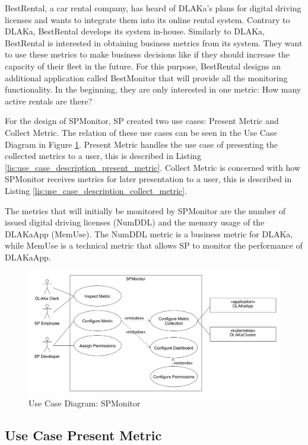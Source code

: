 BestRental, a car rental company, has heard of DLAKa's plans for digital driving licenses
and wants to integrate them into its online rental system. Contrary to DLAKa, BestRental develops its
system in-house. Similarly to DLAKa, BestRental is interested in obtaining business metrics from its system.
They want to use these metrics to make business decisions like if they should increase the capacity of their fleet in the future.
For this purpose, BestRental designs an additional application called BestMonitor that will provide all the monitoring functionality.
In the beginning, they are only interested in one metric: How many active rentals are there?

For the design of SPMonitor, SP created two use cases: Present Metric and Collect Metric.
The relation of these use cases can be seen in the Use Case Diagram in Figure \ref{fig:use_case_monitoring_dlakaapp}.
Present Metric handles the use case of presenting the collected metrics to a user, this is described in Listing \ref{lis:use_case_description_present_metric}.
Collect Metric is concerned with how SPMonitor receives metrics for later presentation to a user, this is described in Listing \ref{lis:use_case_description_collect_metric}.

The metrics that will initially be monitored by SPMonitor are the number of issued digital driving licenses (NumDDL)
and the memory usage of the DLAKaApp (MemUse). The NumDDL metric is a business metric for DLAKa, while MemUse is
a technical metric that allows SP to monitor the performance of DLAKaApp.

\begin{figure}
	\centering
	\includegraphics[width=\textwidth]{figures/2.1_use_case_spmonitor.png}
	\caption{Use Case Diagram: SPMonitor}
	\label{fig:use_case_monitoring_dlakaapp}
\end{figure}

\subsection{Use Case Present Metric}

